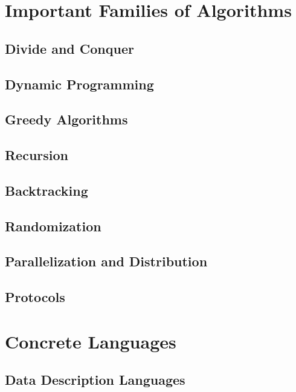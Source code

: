 \documentclass{book}
\begin{document}
\part{Important Families of Algorithms}\label{sec:ad:algo}

\chapter{Divide and Conquer}
 
\chapter{Dynamic Programming}

\chapter{Greedy Algorithms}

\chapter{Recursion}

\chapter{Backtracking}

\chapter{Randomization}

\chapter{Parallelization and Distribution}

\chapter{Protocols}



\part{Concrete Languages}

\chapter{Data Description Languages}
 
\end{document}
